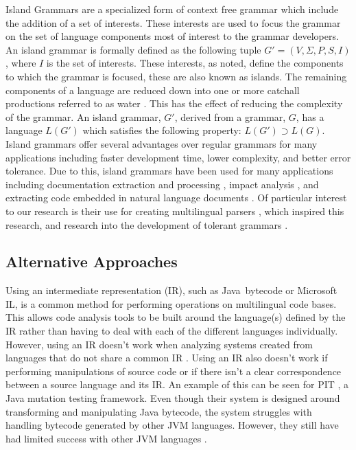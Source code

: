 \documentclass[conference]{IEEEtran}
\begin{document}
Island Grammars are a specialized form of context free grammar which
include the addition of a set of interests. These interests are used to
focus the grammar on the set of language components most of interest to
the grammar developers. An island grammar is formally defined as the
following tuple \(G' = (V,\Sigma{},P,S, I)\)
\cite{moonenGeneratingRobustParsers2001}, where \(I\) is the set of
interests. These interests, as noted, define the components to which the
grammar is focused, these are also known as islands. The remaining
components of a language are reduced down into one or more catchall
productions referred to as water
\cite{moonenGeneratingRobustParsers2001}. This has the effect of
reducing the complexity of the grammar. An island grammar, \(G'\),
derived from a grammar, \(G\), has a language \(L(G')\) which satisfies
the following property: \(L(G') \supset L(G)\). Island grammars offer
several advantages over regular grammars for many applications including
faster development time, lower complexity, and better error tolerance.
Due to this, island grammars have been used for many applications
including documentation extraction and processing
\cite{deursenBuildingDocumentationGenerators1999}, impact analysis
\cite{moonenLightweightImpactAnalysis2002}, and extracting code embedded
in natural language documents
\cite{bettenburgWhatMakesGood2008,bacchelliExtractingStructuredData2011}.
Of particular interest to our research is their use for creating
multilingual parsers \cite{synytskyyRobustMultilingualParsing2003},
which inspired this research, and research into the development of
tolerant grammars
\cite{klusenerDerivingTolerantGrammars2003,goloveshkinTolerantParsingSpecial2018,kursBoundedSeas2015}.

\hypertarget{sec:related}{%
\subsection{Alternative Approaches}\label{sec:related}}

Using an intermediate representation (IR), such as
Java\texttrademark~bytecode or Microsoft IL, is a common method for
performing operations on multilingual code bases. This allows code
analysis tools to be built around the language(s) defined by the IR
rather than having to deal with each of the different languages
individually. However, using an IR doesn't work when analyzing systems
created from languages that do not share a common IR
\cite{linosMetricsToolMultilanguage}. Using an IR also doesn't work if
performing manipulations of source code or if there isn't a clear
correspondence between a source language and its IR. An example of this
can be seen for PIT \cite{colesPITPracticalMutation2016}, a Java
mutation testing framework. Even though their system is designed around
transforming and manipulating Java bytecode, the system struggles with
handling bytecode generated by other JVM languages. However, they still
have had limited success with other JVM languages
\cite{clarkeExperimentingMutationTesting2016}.
\end{document}
